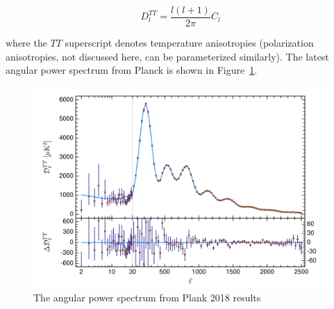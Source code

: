 \begin{equation}
D_{l}^{TT} = \frac{ l(l + 1)}{ 2 \pi} C_{l}
\end{equation}
 
where the $TT$ superscript denotes temperature anisotropies (polarization anisotropies, not discussed here, can be parameterized similarly). The latest angular power spectrum from Planck is shown in Figure~\ref{fig:planck_multipole}.

\begin{figure}[htbp]
\begin{center}
\includegraphics[width=\textwidth]{figures/theory/planck_multipole.png}
\caption{The angular power spectrum from Plank 2018 results  \cite{Planck2018} }
\label{fig:planck_multipole}
\end{center}
\end{figure}


